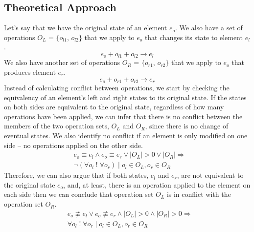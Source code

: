 \subsection{Theoretical Approach} 
\label{sec:theoretical_approach}
Let's say that we have the original state of an element $e_{o}$. We also have a set of operations $O_{L}$ = $\{$$o_{l1}$, $o_{l2}$$\}$ that we apply to $e_{o}$ that changes its state to element $e_{l}$. 
\begin{equation} \label{eq:conflict_3.1}
e_{o} + o_{l1} + o_{l2} \rightarrow e_{l}
\end{equation} 
We also have another set of operations $O_{R}$ = $\{$$o_{r1}$, $o_{r2}$$\}$ that we apply to $e_{o}$ that produces element $e_{r}$.
\begin{equation} \label{eq:conflict_3.2}
e_{o} + o_{r1} + o_{r2} \rightarrow e_{r}
\end{equation} 
Instead of calculating conflict between operations, we start by checking the equivalency of an element's left and right states to its original state. If the states on both sides are equivalent to the original state, regardless of how many operations have been applied, we can infer that there is no conflict between the members of the two operation sets, $O_{L}$ and $O_{R}$, since there is no change of eventual states. We also identify no conflict if an element is only modified on one side -- no operations applied on the other side.
\begin{equation} \label{eq:conflict_3.3}
\begin{split}
& e_{o} \equiv e_{l} \wedge e_{o} \equiv e_{r} \vee |O_{L}| > 0 \vee |O_{R}| \Rightarrow\\
& \neg(\forall o_{l} \;!\; \forall o_{r}) \;|\; o_{l} \in O_{L}, o_{r} \in O_{R}
\end{split}
\end{equation} 
Therefore, we can also argue that if both states, $e_{l}$ and $e_{r}$, are not equivalent to the original state $e_{o}$, and, at least, there is an operation applied to the element on each side then we can conclude that operation set $O_{L}$ is in conflict with the operation set $O_{R}$.
\begin{equation} \label{eq:conflict_3.4}
\begin{split}
& e_{o} \not\equiv e_{l} \vee e_{o} \not\equiv e_{r} \wedge |O_{L}| > 0 \wedge |O_{R}| > 0 \Rightarrow\\
& \forall o_{l} \;!\; \forall o_{r} \;|\; o_{l} \in O_{L}, o_{r} \in O_{R}
\end{split}
\end{equation} 
